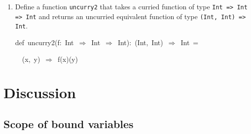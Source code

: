 \begin{enumerate}
\begin{lyxcode}
{\footnotesize{}scala>~val~f:~Int~$\Rightarrow$~Double~=~x~$\Rightarrow$~5.67~+~x}{\footnotesize\par}

{\footnotesize{}scala>~val~g:~Double~$\Rightarrow$~String~=~x~$\Rightarrow$~f\textquotedbl x=\%3.2f\textquotedbl}{\footnotesize\par}

{\footnotesize{}scala>~val~h~=~comp(f,~g)}{\footnotesize\par}

{\footnotesize{}scala>~h(10)}{\footnotesize\par}
\end{lyxcode}
The function \texttt{comp} has two arguments, of types \texttt{Int
$\Rightarrow$ Double} and \texttt{Double $\Rightarrow$ String}.
The result value of \texttt{comp} is of type \texttt{Int $\Rightarrow$
String}, because \texttt{comp} returns a new function that takes an
argument $x$ of type \texttt{Int} and returns a \texttt{String}.
So the full type signature of the function \texttt{comp} is written
as
\begin{lyxcode}
///~(Int~$\Rightarrow$~Double,~Double~$\Rightarrow$~String)~$\Rightarrow$~(Int~$\Rightarrow$~String)
\end{lyxcode}
This is an example of a function that both takes other functions as
arguments \emph{and} returns a new function.
\item Define a function \texttt{uncurry2} that takes a curried function
of type \texttt{Int => Int => Int} and returns an uncurried equivalent
function of type \texttt{(Int, Int) => Int}.
\begin{lyxcode}
{\footnotesize{}def~uncurry2(f:~Int~$\Rightarrow$~Int~$\Rightarrow$~Int):~(Int,~Int)~$\Rightarrow$~Int~=}{\footnotesize\par}

{\footnotesize{}~~(x,~y)~$\Rightarrow$~f(x)(y)}{\footnotesize\par}
\end{lyxcode}
\end{enumerate}

\section{Discussion}

\subsection{Scope of bound variables}

